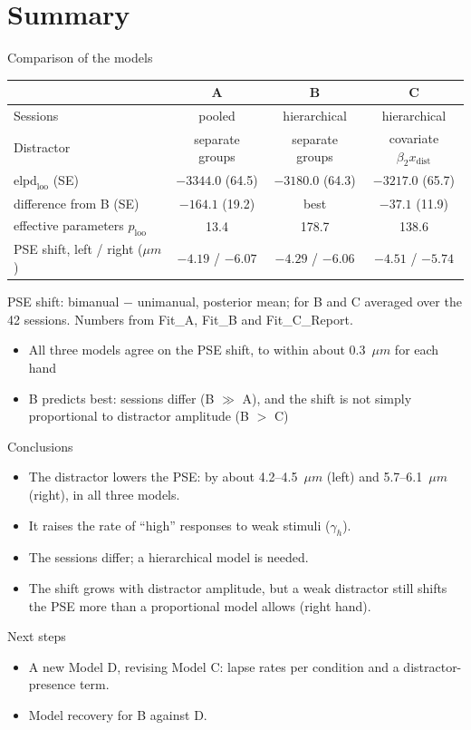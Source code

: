 \section{Summary}

\begin{frame}{Comparison of the models}
  \centering
  \begin{tabular}{lccc}
    \toprule
     & A & B & C \\
    \midrule
    Sessions & pooled & hierarchical & hierarchical \\
    Distractor & separate groups & separate groups & covariate $\beta_2 x_\text{dist}$ \\
    $\text{elpd}_\text{loo}$ (SE) & $-3344.0$ (64.5) & $-3180.0$ (64.3) & $-3217.0$ (65.7) \\
    difference from B (SE) & $-164.1$ (19.2) & best & $-37.1$ (11.9) \\
    effective parameters $p_\text{loo}$ & 13.4 & 178.7 & 138.6 \\
    PSE shift, left / right ($\mu m$) & $-4.19$ / $-6.07$ & $-4.29$ / $-6.06$ & $-4.51$ / $-5.74$ \\
    \bottomrule
  \end{tabular}

  \vspace{0.4em}
  {\scriptsize\color{muted} PSE shift: bimanual $-$ unimanual, posterior mean; for B and C averaged
  over the 42 sessions. Numbers from Fit\_A, Fit\_B and Fit\_C\_Report.}

  \vfill
  \raggedright
  \begin{itemize}
    \item All three models agree on the PSE shift, to within about 0.3~$\mu m$ for each hand
    \item B predicts best: sessions differ (B $\gg$ A), and the shift is not simply proportional to
          distractor amplitude (B $>$ C)
  \end{itemize}
\end{frame}

\begin{frame}{Conclusions}
  \begin{itemize}
    \item The distractor lowers the PSE: by about 4.2--4.5~$\mu m$ (left) and 5.7--6.1~$\mu m$
          (right), in all three models.
    \item It raises the rate of ``high'' responses to weak stimuli ($\gamma_h$).
    \item The sessions differ; a hierarchical model is needed.
    \item The shift grows with distractor amplitude, but a weak distractor still shifts the PSE
          more than a proportional model allows (right hand).
  \end{itemize}
\end{frame}

\begin{frame}{Next steps}
  \begin{itemize}
    \item A new Model D, revising Model C: lapse rates per condition and a distractor-presence
          term.
    \item Model recovery for B against D.
  \end{itemize}
\end{frame}
